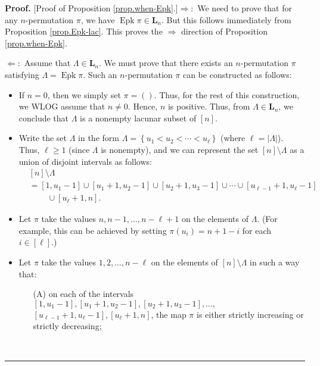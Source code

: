 \documentclass[numbers=enddot,12pt,final,onecolumn,notitlepage]{scrartcl}%
\theoremstyle{definition}
\newenvironment{proof}[1][Proof]{\noindent\textbf{#1.} }{\ \rule{0.5em}{0.5em}}
\newenvironment{verlong}{}{}
\begin{document}
\begin{verlong}
\begin{proof}
[Proof of Proposition \ref{prop.when-Epk}.]$\Longrightarrow:$ We need to prove
that for any $n$-permutation $\pi$, we have $\operatorname*{Epk}\pi
\in\mathbf{L}_{n}$. But this follows immediately from Proposition
\ref{prop.Epk-lac}. This proves the $\Longrightarrow$ direction of Proposition
\ref{prop.when-Epk}.

$\Longleftarrow:$ Assume that $\Lambda\in\mathbf{L}_{n}$. We must prove that
there exists an $n$-permutation $\pi$ satisfying $\Lambda=\operatorname*{Epk}%
\pi$. Such an $n$-permutation $\pi$ can be constructed as follows:

\begin{itemize}
\item If $n=0$, then we simply set $\pi=\left(  {}\right)  $. Thus, for the
rest of this construction, we WLOG assume that $n\neq0$. Hence, $n$ is
positive. Thus, from $\Lambda\in\mathbf{L}_{n}$, we conclude that $\Lambda$ is
a nonempty lacunar subset of $\left[  n\right]  $.

\item Write the set $\Lambda$ in the form $\Lambda=\left\{  u_{1}<u_{2}%
<\cdots<u_{\ell}\right\}  $ (where $\ell=\left\vert \Lambda\right\vert $).
Thus, $\ell\geq1$ (since $\Lambda$ is nonempty), and we can represent the set
$\left[  n\right]  \setminus\Lambda$ as a union of disjoint intervals as
follows:
\begin{align*}
&  \left[  n\right]  \setminus\Lambda\\
&  =\left[  1,u_{1}-1\right]  \cup\left[  u_{1}+1,u_{2}-1\right]  \cup\left[
u_{2}+1,u_{3}-1\right]  \cup\cdots\cup\left[  u_{\ell-1}+1,u_{\ell}-1\right]
\\
&  \ \ \ \ \ \ \ \ \ \ \cup\left[  u_{\ell}+1,n\right]  .
\end{align*}


\item Let $\pi$ take the values $n,n-1,\ldots,n-\ell+1$ on the elements of
$\Lambda$. (For example, this can be achieved by setting $\pi\left(
u_{i}\right)  =n+1-i$ for each $i\in\left[  \ell\right]  $.)

\item Let $\pi$ take the values $1,2,\ldots,n-\ell$ on the elements of
$\left[  n\right]  \setminus\Lambda$ in such a way that:

\begin{itemize}
\item[(A)] on each of the intervals $\left[  1,u_{1}-1\right]  ,\left[
u_{1}+1,u_{2}-1\right]  ,\left[  u_{2}+1,u_{3}-1\right]  ,\ldots,$%
\newline$\left[  u_{\ell-1}+1,u_{\ell}-1\right]  ,\left[  u_{\ell}+1,n\right]
$, the map $\pi$ is either strictly increasing or strictly decreasing;


\end{itemize}
\end{itemize}
\end{proof}
\end{verlong}
\end{document}
